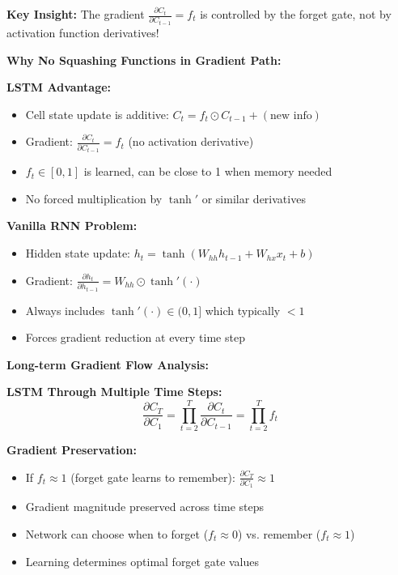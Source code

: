 \documentclass[12pt]{article}
\begin{document}
\begin{enumerate}[(a)]
{    \textbf{Key Insight:} The gradient $\frac{\partial C_t}{\partial C_{t-1}} = f_t$ is controlled by the forget gate, not by activation function derivatives!
    
    \textbf{Why No Squashing Functions in Gradient Path:}
    
    \textbf{LSTM Advantage:}
    \begin{itemize}
        \item Cell state update is additive: $C_t = f_t \odot C_{t-1} + (\text{new info})$
        \item Gradient: $\frac{\partial C_t}{\partial C_{t-1}} = f_t$ (no activation derivative)
        \item $f_t \in [0,1]$ is learned, can be close to 1 when memory needed
        \item No forced multiplication by $\tanh'$ or similar derivatives
    \end{itemize}
    
    \textbf{Vanilla RNN Problem:}
    \begin{itemize}
        \item Hidden state update: $h_t = \tanh(W_{hh} h_{t-1} + W_{hx} x_t + b)$
        \item Gradient: $\frac{\partial h_t}{\partial h_{t-1}} = W_{hh} \odot \tanh'(\cdot)$
        \item Always includes $\tanh'(\cdot) \in (0,1]$ which typically $< 1$
        \item Forces gradient reduction at every time step
    \end{itemize}
    
    \textbf{Long-term Gradient Flow Analysis:}
    
    \textbf{LSTM Through Multiple Time Steps:}
    $$\frac{\partial C_T}{\partial C_1} = \prod_{t=2}^T \frac{\partial C_t}{\partial C_{t-1}} = \prod_{t=2}^T f_t$$
    
    \textbf{Gradient Preservation:}
    \begin{itemize}
        \item If $f_t \approx 1$ (forget gate learns to remember): $\frac{\partial C_T}{\partial C_1} \approx 1$
        \item Gradient magnitude preserved across time steps
        \item Network can choose when to forget ($f_t \approx 0$) vs. remember ($f_t \approx 1$)
        \item Learning determines optimal forget gate values
    \end{itemize}
    
}
\end{enumerate}
\end{document}
